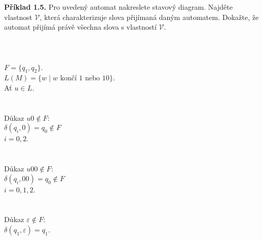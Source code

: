 \documentclass[11pt]{article}
\begin{document}
\noindent
\textbf{Příklad 1.5.}
Pro uvedený automat nakreslete stavový diagram. Najděte vlastnost $\mathcal{V}$, která charakterizuje slova přijímaná daným automatem. Dokažte, že automat přijímá právě všechna slova s vlastností $\mathcal{V}$.
\begin{multicols}{2} %
    \section*{}
        \\
        $F = \{q_1, q_2\}$.\\
        $L(M) = \{w \mid w \text{ končí } 1 \text{ nebo } 10\}$.\\
        Ať $u \in L$.
    
    \columnbreak %
    \section*{}
        \begin{multicols}{2} %
            \section*{}
                Důkaz $u0 \not\in F:$\\
                $\delta(q_i, 0) = q_0 \not\in F$\\
                $i = 0, 2$.
                \\
                \\
                \\
                Důkaz $u00 \not\in F:$\\
                $\delta(q_i, 00) = q_0 \not\in F$\\
                $i = 0, 1, 2$.
                \\
                \\
                \\
                Důkaz $\varepsilon \not\in F:$\\
                $\delta(q_1, \varepsilon) = q_1$.\\ 
                

\end{multicols}
\end{multicols}
\end{document}
